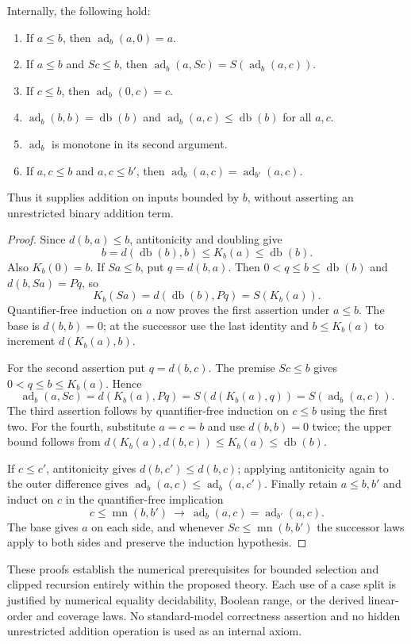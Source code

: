 \begin{lemma}
\label{lem:internal-bounded-addition}
Internally, the following hold:
\begin{enumerate}
\item If $a\le b$, then $\operatorname{ad}_b(a,0)=a$.
\item If $a\le b$ and $Sc\le b$, then
      $\operatorname{ad}_b(a,Sc)=S(\operatorname{ad}_b(a,c))$.
\item If $c\le b$, then $\operatorname{ad}_b(0,c)=c$.
\item $\operatorname{ad}_b(b,b)=\operatorname{db}(b)$ and $\operatorname{ad}_b(a,c)\le \operatorname{db}(b)$ for all $a,c$.
\item $\operatorname{ad}_b$ is monotone in its second argument.
\item If $a,c\le b$ and $a,c\le b'$, then
      $\operatorname{ad}_b(a,c)=\operatorname{ad}_{b'}(a,c)$.
\end{enumerate}
Thus it supplies addition on inputs bounded by $b$, without asserting an
unrestricted binary addition term.
\end{lemma}
\begin{proof}
Since $d(b,a)\le b$, antitonicity and doubling give
\[
            b=d(\operatorname{db}(b),b)\le K_b(a)\le \operatorname{db}(b).
 \tag{K bounds}\label{eq:internal-K-bounds}
\]
Also $K_b(0)=b$.  If $Sa\le b$, put $q=d(b,a)$.
Then $0<q\le b\le \operatorname{db}(b)$ and $d(b,Sa)=Pq$, so
\[
                  K_b(Sa)=d(\operatorname{db}(b),Pq)=S(K_b(a)).
\]
Quantifier-free induction on $a$ now proves the first assertion under
$a\le b$.  The base is $d(b,b)=0$; at the successor use the last
identity and $b\le K_b(a)$ to increment $d(K_b(a),b)$.

For the second assertion put $q=d(b,c)$.  The premise $Sc\le b$ gives
$0<q\le b\le K_b(a)$.  Hence
\[
 \operatorname{ad}_b(a,Sc)
   =d(K_b(a),Pq)=S(d(K_b(a),q))=S(\operatorname{ad}_b(a,c)).
\]
The third assertion follows by quantifier-free induction on $c\le b$
using the first two.  For the fourth, substitute $a=c=b$ and use
$d(b,b)=0$ twice; the upper bound follows from
$d(K_b(a),d(b,c))\le K_b(a)\le \operatorname{db}(b)$.

If $c\le c'$, antitonicity gives $d(b,c')\le d(b,c)$; applying
antitonicity again to the outer difference gives
$\operatorname{ad}_b(a,c)\le \operatorname{ad}_b(a,c')$.  Finally retain $a\le b,b'$ and induct on $c$
in the quantifier-free implication
\[
 c\le \operatorname{mn}(b,b')\ \longrightarrow\ \operatorname{ad}_b(a,c)=\operatorname{ad}_{b'}(a,c).
\]
The base gives $a$ on each side, and whenever $Sc\le \operatorname{mn}(b,b')$ the
successor laws apply to both sides and preserve the induction hypothesis.
\end{proof}

These proofs establish the numerical prerequisites for bounded selection
and clipped recursion entirely within the proposed theory.  Each use of
a case split is justified by numerical equality decidability, Boolean
range, or the derived linear-order and coverage laws.  No standard-model
correctness assertion and no hidden unrestricted addition operation is
used as an internal axiom.
